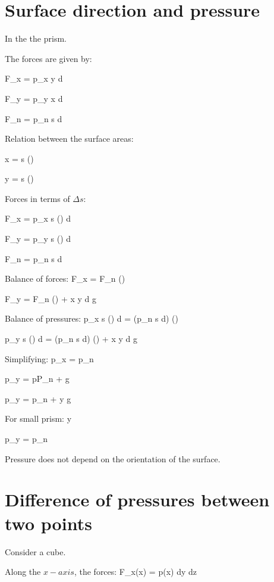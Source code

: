 \section{Surface direction and pressure}
	In the the prism.
	
	The forces are given by:
	
	\eqb
		F_x = p_x \Delta y d
	\eqe
	
	\eqb
		F_y = p_y \Delta x d
	\eqe
	
	\eqb
		F_n = p_n \Delta s d
	\eqe
	
	Relation between the surface areas:
	
	\eqb
		\Delta x = \Delta s \cos(\theta)
	\eqe
	
	\eqb
		\Delta y = \Delta s \sin(\theta)
	\eqe
	
	Forces in terms of $\Delta s$:
	
	\eqb
		F_x = p_x \Delta s \sin(\theta) d
	\eqe
	
	\eqb
		F_y = p_y \Delta s \cos(\theta) d
	\eqe
	
	\eqb
		F_n = p_n \Delta s d
	\eqe
	
	Balance of forces:
	\eqb
		F_x = F_n \sin(\theta)
	\eqe
	
	\eqb
		F_y = F_n \cos(\theta)
			+ \rho {} \Delta x \Delta y d  g
	\eqe
	
	Balance of pressures:
	\eqb
		p_x \Delta s \sin(\theta) d
			= (p_n \Delta s d) \sin(\theta)
	\eqe
	
	\eqb
		p_y \Delta s \cos(\theta) d
			= (p_n \Delta s d) \cos(\theta)
			+ \rho {} \Delta x \Delta y d  g
	\eqe
	
	Simplifying:
	\eqb
		p_x = p_n 
	\eqe
	
	\eqb
		p_y = pP_n
			+ \rho \frac{1}{2}
			\frac{\Delta x \Delta y}{\Delta s \cos(\theta)}  g
	\eqe
	
	\eqb
		p_y = p_n + \rho {} \Delta y  g
	\eqe
	
	For small prism:
	\eqb
		\Delta y \to 0
	\eqe

	\eqb
		p_y = p_n
	\eqe
	
	Pressure does not depend on the orientation of the surface.
	
\section{Difference of pressures between two points}
	Consider a cube.
	
	Along the $x-axis$, the forces:
	\eqb
		F_x(x) = p(x) dy dz 
	\eqe
	
